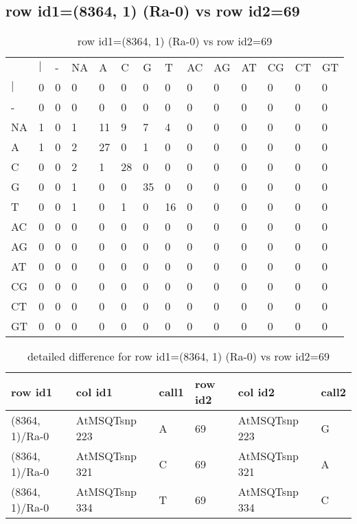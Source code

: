 \subsection{row id1=(8364, 1) (Ra-0) vs row id2=69}
\begin{center}
\begin{longtable}{|l|l|l|l|l|l|l|l|l|l|l|l|l|l|}
\caption{row id1=(8364, 1) (Ra-0) vs row id2=69} \label{table_dm400}\\
\hline
\\
\hline
&$|$&-&NA&A&C&G&T&AC&AG&AT&CG&CT&GT\\
$|$&0&0&0&0&0&0&0&0&0&0&0&0&0\\
-&0&0&0&0&0&0&0&0&0&0&0&0&0\\
NA&1&0&1&11&9&7&4&0&0&0&0&0&0\\
A&1&0&2&27&0&1&0&0&0&0&0&0&0\\
C&0&0&2&1&28&0&0&0&0&0&0&0&0\\
G&0&0&1&0&0&35&0&0&0&0&0&0&0\\
T&0&0&1&0&1&0&16&0&0&0&0&0&0\\
AC&0&0&0&0&0&0&0&0&0&0&0&0&0\\
AG&0&0&0&0&0&0&0&0&0&0&0&0&0\\
AT&0&0&0&0&0&0&0&0&0&0&0&0&0\\
CG&0&0&0&0&0&0&0&0&0&0&0&0&0\\
CT&0&0&0&0&0&0&0&0&0&0&0&0&0\\
GT&0&0&0&0&0&0&0&0&0&0&0&0&0\\
\hline
\end{longtable}
\end{center}

\begin{center}
\begin{longtable}{|l|l|l|l|l|l|}
\caption{detailed difference for row id1=(8364, 1) (Ra-0) vs row id2=69} \label{table_dm401}\\
\hline
row id1&col id1&call1&row id2&col id2&call2\\
\hline
(8364, 1)/Ra-0&AtMSQTsnp 223&A&69&AtMSQTsnp 223&G\\
(8364, 1)/Ra-0&AtMSQTsnp 321&C&69&AtMSQTsnp 321&A\\
(8364, 1)/Ra-0&AtMSQTsnp 334&T&69&AtMSQTsnp 334&C\\
\hline
\end{longtable}
\end{center}

